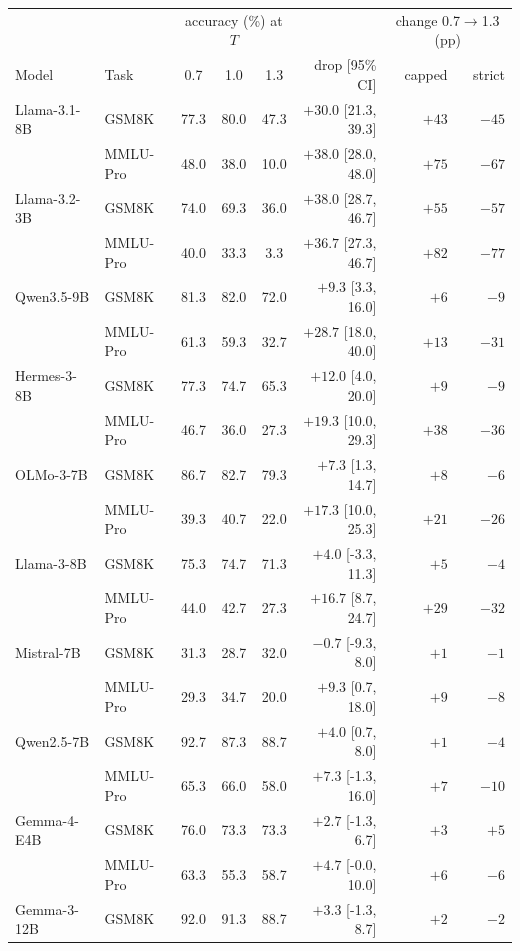 \begin{tabular}{llcccrrr}
\toprule
 & & \multicolumn{3}{c}{accuracy (\%) at $T$} & & \multicolumn{2}{c}{change 0.7$\to$1.3 (pp)} \\
Model & Task & 0.7 & 1.0 & 1.3 & drop [95\% CI] & capped & strict \\
\midrule
Llama-3.1-8B & GSM8K & 77.3 & 80.0 & 47.3 & $\mathbf{+30.0}$ [21.3, 39.3] & $+43$ & $-45$ \\
 & MMLU-Pro & 48.0 & 38.0 & 10.0 & $\mathbf{+38.0}$ [28.0, 48.0] & $+75$ & $-67$ \\
Llama-3.2-3B & GSM8K & 74.0 & 69.3 & 36.0 & $\mathbf{+38.0}$ [28.7, 46.7] & $+55$ & $-57$ \\
 & MMLU-Pro & 40.0 & 33.3 & 3.3 & $\mathbf{+36.7}$ [27.3, 46.7] & $+82$ & $-77$ \\
Qwen3.5-9B & GSM8K & 81.3 & 82.0 & 72.0 & $+9.3$ [3.3, 16.0] & $+6$ & $-9$ \\
 & MMLU-Pro & 61.3 & 59.3 & 32.7 & $\mathbf{+28.7}$ [18.0, 40.0] & $+13$ & $-31$ \\
Hermes-3-8B & GSM8K & 77.3 & 74.7 & 65.3 & $+12.0$ [4.0, 20.0] & $+9$ & $-9$ \\
 & MMLU-Pro & 46.7 & 36.0 & 27.3 & $+19.3$ [10.0, 29.3] & $+38$ & $-36$ \\
OLMo-3-7B & GSM8K & 86.7 & 82.7 & 79.3 & $+7.3$ [1.3, 14.7] & $+8$ & $-6$ \\
 & MMLU-Pro & 39.3 & 40.7 & 22.0 & $+17.3$ [10.0, 25.3] & $+21$ & $-26$ \\
Llama-3-8B & GSM8K & 75.3 & 74.7 & 71.3 & $+4.0$ [-3.3, 11.3] & $+5$ & $-4$ \\
 & MMLU-Pro & 44.0 & 42.7 & 27.3 & $+16.7$ [8.7, 24.7] & $+29$ & $-32$ \\
\midrule
Mistral-7B & GSM8K & 31.3 & 28.7 & 32.0 & $-0.7$ [-9.3, 8.0] & $+1$ & $-1$ \\
 & MMLU-Pro & 29.3 & 34.7 & 20.0 & $+9.3$ [0.7, 18.0] & $+9$ & $-8$ \\
Qwen2.5-7B & GSM8K & 92.7 & 87.3 & 88.7 & $+4.0$ [0.7, 8.0] & $+1$ & $-4$ \\
 & MMLU-Pro & 65.3 & 66.0 & 58.0 & $+7.3$ [-1.3, 16.0] & $+7$ & $-10$ \\
Gemma-4-E4B & GSM8K & 76.0 & 73.3 & 73.3 & $+2.7$ [-1.3, 6.7] & $+3$ & $+5$ \\
 & MMLU-Pro & 63.3 & 55.3 & 58.7 & $+4.7$ [-0.0, 10.0] & $+6$ & $-6$ \\
Gemma-3-12B & GSM8K & 92.0 & 91.3 & 88.7 & $+3.3$ [-1.3, 8.7] & $+2$ & $-2$ \\

\end{tabular}
